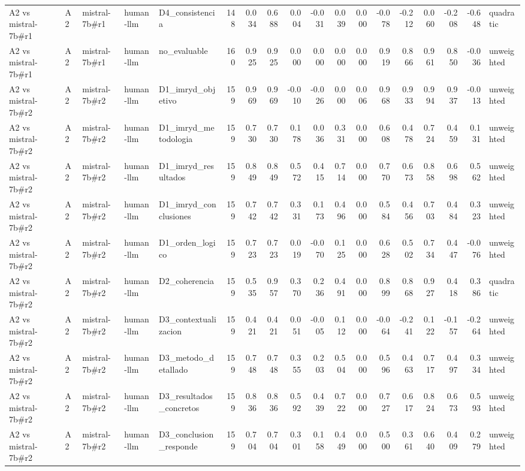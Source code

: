 \begin{table}
{\begin{tabular}{lllllrrrrrrrrrrrrl}
A2 vs mistral-7b\#r1 & A2 & mistral-7b\#r1 & human-llm & D4\_consistencia & 148 & 0.034 & 0.688 & 0.004 & -0.031 & 0.039 & 0.000 & -0.078 & -0.212 & 0.060 & -0.208 & -0.648 & quadratic \\
A2 vs mistral-7b\#r1 & A2 & mistral-7b\#r1 & human-llm & no\_evaluable & 160 & 0.925 & 0.925 & 0.000 & 0.000 & 0.000 & 0.000 & 0.919 & 0.866 & 0.961 & 0.850 & -0.036 & unweighted \\
A2 vs mistral-7b\#r2 & A2 & mistral-7b\#r2 & human-llm & D1\_imryd\_objetivo & 159 & 0.969 & 0.969 & -0.010 & -0.026 & 0.000 & 0.006 & 0.968 & 0.933 & 0.994 & 0.937 & -0.013 & unweighted \\
A2 vs mistral-7b\#r2 & A2 & mistral-7b\#r2 & human-llm & D1\_imryd\_metodologia & 159 & 0.730 & 0.730 & 0.178 & 0.036 & 0.331 & 0.000 & 0.608 & 0.478 & 0.724 & 0.459 & 0.131 & unweighted \\
A2 vs mistral-7b\#r2 & A2 & mistral-7b\#r2 & human-llm & D1\_imryd\_resultados & 159 & 0.849 & 0.849 & 0.572 & 0.415 & 0.714 & 0.000 & 0.770 & 0.673 & 0.858 & 0.698 & 0.562 & unweighted \\
A2 vs mistral-7b\#r2 & A2 & mistral-7b\#r2 & human-llm & D1\_imryd\_conclusiones & 159 & 0.742 & 0.742 & 0.331 & 0.173 & 0.496 & 0.000 & 0.584 & 0.456 & 0.703 & 0.484 & 0.323 & unweighted \\
A2 vs mistral-7b\#r2 & A2 & mistral-7b\#r2 & human-llm & D1\_orden\_logico & 159 & 0.723 & 0.723 & 0.019 & -0.070 & 0.125 & 0.000 & 0.628 & 0.502 & 0.734 & 0.447 & -0.076 & unweighted \\
A2 vs mistral-7b\#r2 & A2 & mistral-7b\#r2 & human-llm & D2\_coherencia & 159 & 0.535 & 0.957 & 0.370 & 0.236 & 0.491 & 0.000 & 0.899 & 0.868 & 0.927 & 0.418 & 0.386 & quadratic \\
A2 vs mistral-7b\#r2 & A2 & mistral-7b\#r2 & human-llm & D3\_contextualizacion & 159 & 0.421 & 0.421 & 0.051 & -0.005 & 0.112 & 0.000 & -0.064 & -0.241 & 0.122 & -0.157 & -0.264 & unweighted \\
A2 vs mistral-7b\#r2 & A2 & mistral-7b\#r2 & human-llm & D3\_metodo\_detallado & 159 & 0.748 & 0.748 & 0.355 & 0.203 & 0.504 & 0.000 & 0.596 & 0.463 & 0.717 & 0.497 & 0.334 & unweighted \\
A2 vs mistral-7b\#r2 & A2 & mistral-7b\#r2 & human-llm & D3\_resultados\_concretos & 159 & 0.836 & 0.836 & 0.592 & 0.439 & 0.722 & 0.000 & 0.727 & 0.617 & 0.824 & 0.673 & 0.593 & unweighted \\
A2 vs mistral-7b\#r2 & A2 & mistral-7b\#r2 & human-llm & D3\_conclusion\_responde & 159 & 0.704 & 0.704 & 0.301 & 0.158 & 0.449 & 0.000 & 0.500 & 0.361 & 0.640 & 0.409 & 0.279 & unweighted \\

\end{tabular}}
\end{table}
